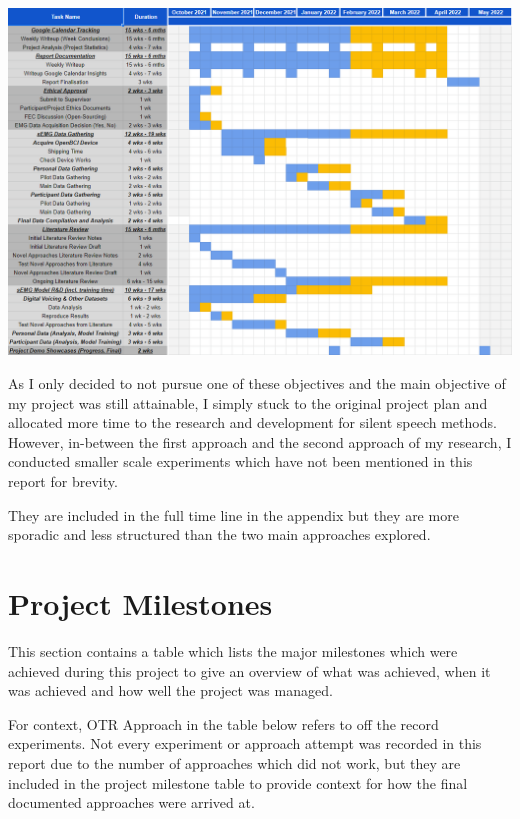 \begin{center}
\includegraphics[scale=0.3]{graphics/planning/original_plan.png}
\end{center}

As I only decided to not pursue one of these objectives and
the main objective of my project was still attainable, I
simply stuck to the original project plan and allocated more
time to the research and development for silent speech
methods. However, in-between the first approach and the
second approach of my research, I conducted smaller scale
experiments which have not been mentioned in this report
for brevity.

They are included in the full time line in
the appendix but they are more sporadic and less structured
than the two main approaches explored.

\section{Project Milestones}

This section contains a table which lists the major milestones which were
achieved during this project to give an overview of what was achieved, when it was
achieved and how well the project was managed.

For context, OTR Approach in the table below refers to off the record experiments.
Not every experiment or approach attempt was recorded in this report due to the
number of approaches which did not work, but they are included in the project
milestone table to provide context for how the final documented approaches
were arrived at.

